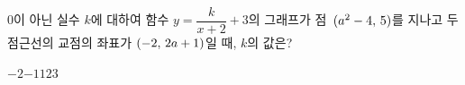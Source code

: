 \hspace*{2mm}\begin{minipage}[t]{\dimexpr\linewidth-2mm\relax}\vspace{0pt}
$0$이 아닌 실수 $k$에 대하여 함수 $y=\dfrac{k}{x+2}+3$의 그래프가 점~$(a^2-4,\mkern3mu 5)$를 지나고 두 점근선의 교점의 좌표가 $(-2,\mkern3mu 2a+1)$일 때, $k$의 값은?
\begin{choices32}{$-2$}{$-1$}{$1$}{$2$}{$3$}\end{choices32}\end{minipage}
